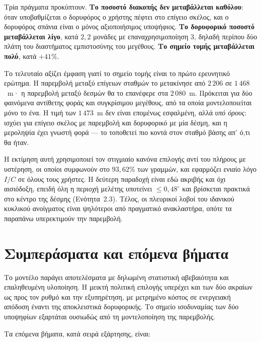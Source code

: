 \documentclass[11pt,a4paper]{article}
\begin{document}
Τρία πράγματα προκύπτουν. \textbf{Το ποσοστό διακοπής δεν μεταβάλλεται
καθόλου}: όταν υποβαθμίζεται ο δορυφόρος ο χρήστης πέφτει στο επίγειο σκέλος,
και ο δορυφόρος σπάνια είναι ο μόνος αξιοποιήσιμος υποψήφιος. \textbf{Το
δορυφορικό ποσοστό μεταβάλλεται λίγο}, κατά $2{,}2$ μονάδες με επαναχρησιμοποίηση
3, δηλαδή περίπου δύο πλάτη του διαστήματος εμπιστοσύνης του μεγέθους.
\textbf{Το σημείο τομής μεταβάλλεται πολύ}, κατά $+41\%$.

Το τελευταίο αξίζει έμφαση γιατί το σημείο τομής είναι το πρώτο ερευνητικό
ερώτημα. Η παρεμβολή μεταξύ επίγειων σταθμών το μετακίνησε από $2\,206$ σε
$1\,468$~m· η παρεμβολή μεταξύ δεσμών θα το επανέφερε στα $2\,080$~m. Πρόκειται
για δύο φαινόμενα αντίθετης φοράς και συγκρίσιμου μεγέθους, από τα οποία
μοντελοποιείται μόνο το ένα. Η τιμή των $1\,473$~m δεν είναι επομένως
εσφαλμένη, αλλά \emph{υπό όρους}: ισχύει για επίγειο σκέλος με παρεμβολή και
δορυφορικό με μία δέσμη, και η μεροληψία έχει γνωστή φορά — το τοποθετεί πιο
κοντά στον σταθμό βάσης απ' ό,τι θα ήταν.

Η εκτίμηση αυτή χρησιμοποιεί τον στιγμιαίο κανόνα επιλογής αντί του πλήρους με
υστέρηση, οι οποίοι συμφωνούν στο $93{,}62\%$ των γραμμών, και εφαρμόζει ενιαίο
λόγο $I/C$ σε όλους τους χρήστες. Η δεύτερη παραδοχή είναι εδώ ακριβής και όχι αισιόδοξη, επειδή
όλη η περιοχή μελέτης υποτείνει $\le 0{,}48^\circ$ και βρίσκεται πρακτικά στο
κέντρο της δέσμης (Ενότητα~2.3). Τέλος, οι πλευρικοί λοβοί του ιδανικού
κυκλικού ανοίγματος είναι ψηλότεροι από πραγματικό ανακλαστήρα, οπότε τα
παραπάνω υπερεκτιμούν την παρεμβολή.

\section{Συμπεράσματα και επόμενα βήματα}

Το μοντέλο παράγει αποτελέσματα με δηλωμένη στατιστική αβεβαιότητα και
επαληθευμένη υλοποίηση. Η μεικτή πολιτική επιλογής υπερέχει και των δύο ακραίων
ως προς τον ρυθμό και την εξυπηρέτηση, με μετρημένο κόστος σε ενεργειακή
απόδοση έναντι της αποκλειστικά δορυφορικής. Το σημείο ισοδυναμίας των δύο
υποψηφίων εξαρτάται ουσιωδώς από τη μοντελοποίηση της παρεμβολής.

Τα επόμενα βήματα, κατά σειρά εξάρτησης, είναι:
\end{document}

